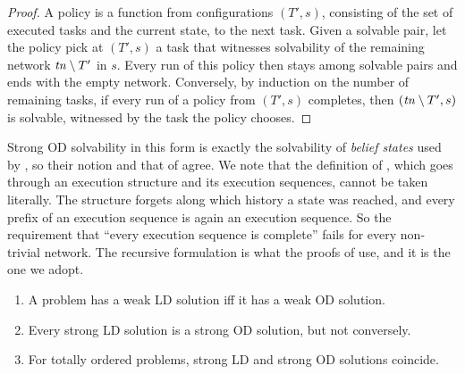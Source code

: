 \begin{proof}
  A policy is a function from configurations $(T',s)$, consisting of the set of executed tasks
  and the current state, to the next task. Given a solvable pair, let the policy pick at
  $(T',s)$ a task that witnesses solvability of the remaining network $\mathit{tn}\setminus T'$ in $s$.
  Every run of this policy then stays among solvable pairs and ends with the empty network.
  Conversely, by induction on the number of remaining tasks, if every run of a policy from
  $(T',s)$ completes, then $(\mathit{tn}\setminus T',s)$ is solvable, witnessed by the task the policy
  chooses.
\end{proof}

Strong OD solvability in this form is exactly the solvability of \emph{belief states} used by
\DB{}, so their notion and that of \CBa{} agree. We note that the definition of \CBa{}, which
goes through an execution structure and its execution sequences, cannot be taken literally. The
structure forgets along which history a state was reached, and every prefix of an execution
sequence is again an execution sequence. So the requirement that ``every execution sequence is
complete'' fails for every non-trivial network. The recursive formulation is what the proofs of
\CBa{} use, and it is the one we adopt.

\begin{proposition}\label{prop:fm-relations}
  \begin{enumerate}[label=(\roman*)]
    \item A problem has a weak LD solution iff it has a weak OD solution.
    \item Every strong LD solution is a strong OD solution, but not conversely.
    \item For totally ordered problems, strong LD and strong OD solutions coincide.
  \end{enumerate}
\end{proposition}

